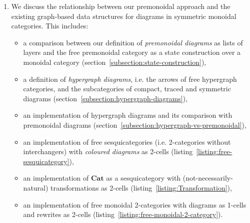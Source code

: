 \begin{enumerate}
\item We discuss the relationship between our premonoidal approach and the existing graph-based data structures for diagrams in symmetric monoidal categories.
This includes:
\begin{itemize}
\item a comparison between our definition of \emph{premonoidal diagrams} as lists of layers and the free premonoidal category as a state construction over a monoidal category (section~\ref{subsection:state-construction}),
\item a definition of \emph{hypergraph diagrams}, i.e. the arrows of free hypergraph categories, and the subcategories of compact, traced and symmetric diagrams (section~\ref{subsection:hypergraph-diagrams}),
\item an implementation of hypergraph diagrams and its comparison with premonoidal diagrams (section~\ref{subsection:hypergraph-vs-premonoidal}),
\item an implementation of free sesquicategories (i.e. 2-categories without interchangers) with \emph{coloured diagrams} as 2-cells (listing~\ref{listing:free-sesquicategory}),
\item an implementation of $\mathbf{Cat}$ as a sesquicategory with (not-necessarily-natural) transformations as 2-cells (listing~\ref{listing:Transformation}),
\item an implementation of free monoidal 2-categories with diagrams as 1-cells and rewrites as 2-cells (listing~\ref{listing:free-monoidal-2-category}).
\end{itemize}
\end{enumerate}

